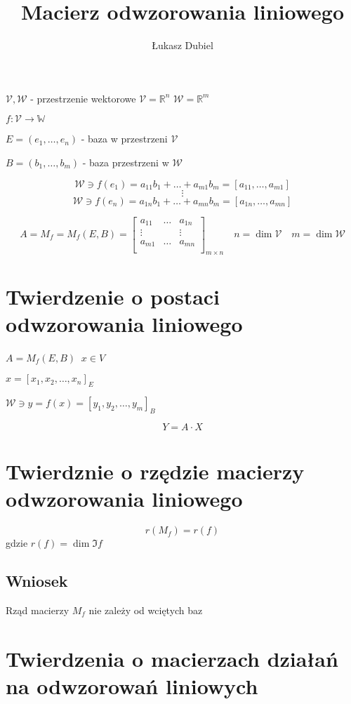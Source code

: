 \documentclass[11pt]{article}
\author{Łukasz Dubiel}
\title{Macierz odwzorowania liniowego}
\begin{document}
\maketitle

$\mathcal{V,W}$ - przestrzenie wektorowe $ \mathcal{V} = \mathbb{R}^n$ $\mathcal{W} = \mathbb{R}^m$ 

$ f : \mathcal{V} \to \mathbb{W} $

$ E = ( e_1 , \ldots , e_n ) $ - baza w przestrzeni $\mathcal{V}$

$B = (b_1, \ldots , b_m) $ - baza przestrzeni w $\mathcal{W}$

$$ \mathcal{W} \ni f(e_1) = a_{11} b_1 + \ldots +  a_{m1} b_m  = [a_{11},\ldots, a_{m1} ] $$
$$ \vdots $$
$$ \mathcal{W} \ni f(e_n) = a_{1n} b_1 + \ldots +  a_{mn} b_m  = [a_{1n},\ldots, a_{mn} ] $$

$$ A = M_f = M_f(E,B) = \begin{bmatrix}
	a_{11} & \ldots & a_{1n}\\
	\vdots &  & \vdots\\
	a_{m1} & \ldots & a_{mn}\\
\end{bmatrix}_{m \times n} \quad n = \dim{\mathcal{V}} \quad m = \dim{\mathcal{W}}$$

\section{Twierdzenie o postaci odwzorowania liniowego}

$A = M_f(E,B) \ $
$ x \in V \ $ 

$ x = [x_1,x_2,\ldots,x_n]_E $

$ \mathcal{W} \ni y = f(x) = [y_1,y_2,\ldots,y_m]_B $

$$ Y = A \cdot X $$

\section{Twierdznie o rzędzie macierzy odwzorowania liniowego}

$$ r(M_f) = r(f) $$ gdzie $r(f) = \dim{\Im{f}}$

\subsection{Wniosek}
Rząd macierzy $M_f$ nie zależy od wciętych baz

\section{Twierdzenia o macierzach działań na odwzorowań liniowych}
\end{document}
